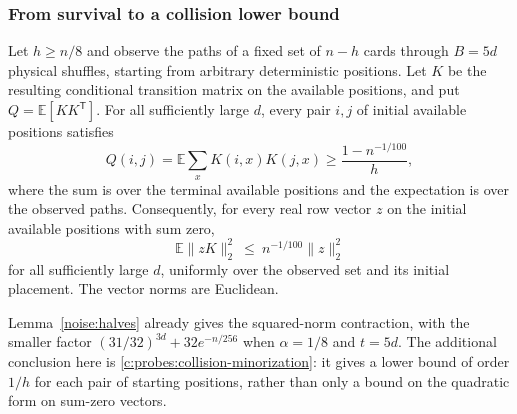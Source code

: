 \subsubsection{From survival to a collision lower bound}

\begin{proposition}
\label{c:probes:kernel-contraction}
Let $h\ge n/8$ and observe the paths of a fixed set of $n-h$ cards
through $B=5d$ physical shuffles, starting from arbitrary deterministic
positions. Let $K$ be the resulting conditional transition matrix on
the available positions, and put $Q=\mathbb E[KK^{\mathsf T}]$.
For all sufficiently large $d$, every pair $i,j$ of initial available
positions satisfies
\begin{equation}
 Q(i,j)=\mathbb E\sum_x K(i,x)K(j,x)
       \ge\frac{1-n^{-1/100}}h,
 \label{c:probes:collision-minorization}
\end{equation}
where the sum is over the terminal available positions and the
expectation is over the observed paths. Consequently, for every real
row vector $z$ on the initial available positions with sum zero,
\begin{equation}
\mathbb E\|zK\|_2^2\ \le\ n^{-1/100}\|z\|_2^2
\label{c:probes:eq:1}
\end{equation}
for all sufficiently large \(d\), uniformly over the observed set and its initial placement.
The vector norms are Euclidean.
\end{proposition}

Lemma~\ref{noise:halves} already gives the squared-norm contraction,
with the smaller factor $(31/32)^{3d}+32e^{-n/256}$ when
$\alpha=1/8$ and $t=5d$. The additional conclusion here is
\eqref{c:probes:collision-minorization}: it gives a lower bound of order
$1/h$ for each pair of starting positions, rather than only a bound on
the quadratic form on sum-zero vectors.

